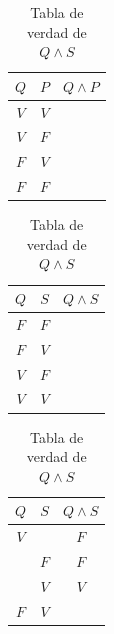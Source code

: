 \documentclass[letterpaper, twoside]{article}
\begin{document}
\begin{table}[h]
  
  \centering
  \begin{minipage}[t]{0.31\textwidth}
    \centering
    \begin{tabular}{|c|c|c|}
      \hline
      $Q$ & $P$ & $Q\land P$ \\ \hline
      $V$ & $V$ &  \\ \hline
      $V$ & $F$ &  \\ \hline
      $F$ & $V$ &  \\ \hline
      $F$ & $F$ &  \\
      \hline
    \end{tabular}
    \caption*{Tabla de verdad de $Q\land P$}
  \end{minipage}
  \hfil
  \begin{minipage}[t]{0.31\textwidth}
    \centering
    \begin{tabular}{|c|c|c|}
      \hline
      $Q$ & $S$ & $Q\land S$ \\ \hline
      $F$ & $F$ &  \\ \hline
      $F$ & $V$ &  \\ \hline
      $V$ & $F$ &  \\ \hline
      $V$ & $V$ &  \\
      \hline
    \end{tabular}
    \caption*{Tabla de verdad de $Q\land S$}
  \end{minipage}
  \begin{minipage}[t]{0.31\textwidth}
    \centering
    \begin{tabular}{|c|c|c|}
      \hline
      $Q$ & $S$ & $Q\land S$ \\ \hline
      $V$ &     &  $F$ \\ \hline
          & $F$ &  $F$ \\ \hline
          & $V$ &  $V$ \\ \hline
      $F$ & $V$ &  \\
      \hline
    \end{tabular}
    \caption*{Tabla de verdad de $Q\land S$}
  \end{minipage}

\end{table}



\newpage

\clearpage
\fancyhf{}
\setcounter{page}{1} %
\cfoot{\thepage}
\end{document}
